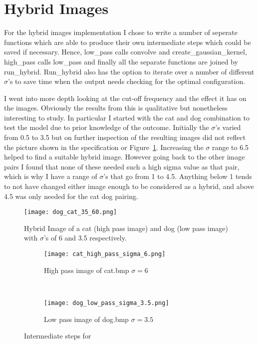 \documentclass[a4paper,10pt]{article}
\begin{document}
\section{Hybrid Images}
For the hybrid images implementation I chose to write a number of seperate
functions which are able to produce their own intermediate steps which could be
saved if necessary. Hence, low_pass calls convolve and create_gaussian_kernel,
high_pass calls low_pass and finally all the separate functions are joined by
run_hybrid. Run_hybrid also has the option to iterate over a number of different
$\sigma$'s to save time when the output needs checking for the optimal
configuration.

I went into more depth looking at the cut-off frequency and the effect it has
on the images. Obviously the results from this is qualitative but nonetheless
interesting to study. In particular I started with the cat and dog combination
to test the model due to prior knowledge of the outcome. Initially the $\sigma$'s
varied from 0.5 to 3.5 but on further inspection of the resulting images did not
reflect the picture shown in the specification or Figure~\ref{fig:dog_cat}.
Increasing the $\sigma$ range to 6.5 helped to find a suitable hybrid image.
However going back to the other image pairs I found that none of these needed
such a high sigma value as that pair, which is why I have a range of $\sigma$'s
that go from 1 to 4.5. Anything below 1 tends to not have changed either image
enough to be considered as a hybrid, and above 4.5 was only needed for the cat
dog pairing.

\begin{figure}[ht!]
    \centering
    \texttt{[image: dog\_cat\_35\_60.png]}
    \caption{Hybrid Image of a cat (high pass image) and dog (low pass image)
             with $\sigma$'s of 6 and 3.5 respectively. \label{fig:dog_cat}}
\end{figure}

\begin{figure}[ht!]
    \centering
    \begin{subfigure}[b]{0.3\textwidth}
        \texttt{[image: cat\_high\_pass\_sigma\_6.png]}
        \caption{High pass image of cat.bmp $\sigma = 6$\label{fig:high_cat}}
    \end{subfigure}
    ~%
    \begin{subfigure}[b]{0.3\textwidth}
        \texttt{[image: dog\_low\_pass\_sigma\_3.5.png]}
        \caption{Low pass image of dog.bmp $\sigma = 3.5$\label{fig:low_dog}}
    \end{subfigure}
\caption{Intermediate steps for  \label{Figure:fig_hist_bi_rand}}
\end{figure}
\end{document}
